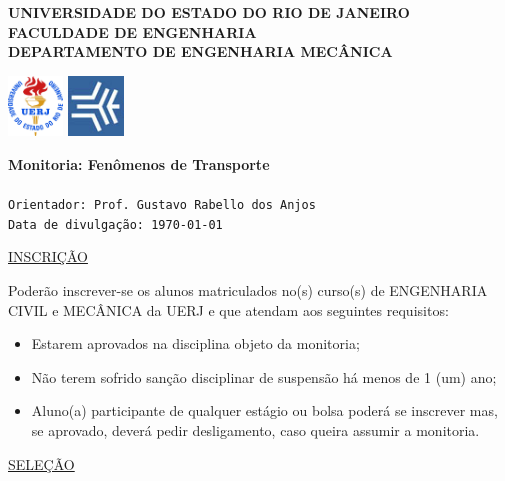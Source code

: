 \documentclass[a4paper,portuguese,10pt]{article}
\begin{document}
\thispagestyle{empty}

\begin{minipage}{0.72\linewidth}
	\large\textbf{UNIVERSIDADE DO ESTADO DO RIO DE JANEIRO\\
	              FACULDADE DE ENGENHARIA\\
				  DEPARTAMENTO DE ENGENHARIA MECÂNICA}
\end{minipage}
\begin{minipage}{0.27\linewidth}
	\flushright
	\includegraphics[height=16mm]{figs/logouerj.jpg}
	\hspace{.5cm}
	\includegraphics[height=16mm]{figs/fen.png}
\end{minipage}

\hrulefill

\Large \color{NavyBlue} \textbf{Monitoria: Fenômenos de Transporte}\\
\color{Black}\\ 
\normalsize \texttt{Orientador: Prof. Gustavo Rabello dos Anjos}\\
\normalsize \texttt{Data de divulgação: \today}

\vspace{2cm}
\underline{INSCRIÇÃO}

Poderão inscrever-se os alunos matriculados no(s) curso(s) de ENGENHARIA
CIVIL e MECÂNICA da UERJ e que atendam aos seguintes requisitos:

\begin{itemize}
	\item Estarem aprovados na disciplina objeto da monitoria;
	\item Não terem sofrido sanção disciplinar de suspensão há menos de
	1 (um) ano;
	\item Aluno(a) participante de qualquer estágio ou bolsa poderá se
	inscrever mas, se aprovado, deverá pedir desligamento, caso queira
	assumir a monitoria.
\end{itemize}

\vspace{1cm}

\underline{SELEÇÃO}
\end{document}
